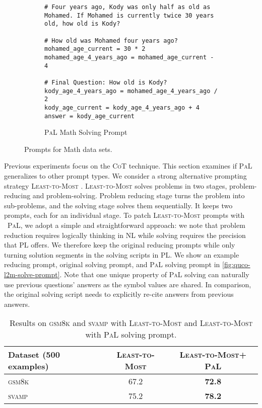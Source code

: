 \documentclass[dvipsnames]{article} \usepackage[accepted]{icml2022}
\newcommand{\ours}{\textsc{PaL}\xspace}
\newcommand{\cotp}{\textsc{CoT}\xspace}
\newcommand{\tomost}{\textsc{Least-to-Most}\xspace}
\newcommand{\gsm}{\textsc{gsm8k}\xspace}
\newcommand{\svamp}{\textsc{svamp}\xspace}
\begin{document}
\begin{figure*}[!ht]
\begin{subfigure}[t]{.95\textwidth}

 \begin{verbatim}
# Four years ago, Kody was only half as old as Mohamed. If Mohamed is currently twice 30 years old, how old is Kody?

# How old was Mohamed four years ago?
mohamed_age_current = 30 * 2
mohamed_age_4_years_ago = mohamed_age_current - 4

# Final Question: How old is Kody?
kody_age_4_years_ago = mohamed_age_4_years_ago / 2
kody_age_current = kody_age_4_years_ago + 4
answer = kody_age_current
\end{verbatim}
\caption{\ours Math Solving Prompt}
\end{subfigure}
\caption{Prompts for Math data sets.}
\label{fig:quco-l2m-solve-prompt}
 \end{figure*}

Previous experiments focus on the \cotp technique. This section examines if \ours generalizes to other prompt types. We consider a strong alternative prompting strategy \tomost 
\cite{zhou2022least}. \tomost solves problems in two stages, problem-reducing and problem-solving. Problem reducing stage turns the problem into sub-problems, and the solving stage solves them sequentially. It keeps two prompts, each for an individual stage. To patch \tomost prompts with \
\ours, we adopt a simple and straightforward approach: we note that problem reduction requires logically thinking in NL while solving requires the precision that PL offers. We therefore keep the original reducing prompts while only turning solution segments in the solving scripts in PL. We show an example reducing prompt, original solving prompt, and \ours solving prompt in \autoref{fig:quco-l2m-solve-prompt}. Note that one unique property of \ours solving can naturally use previous questions' answers as the symbol values are shared. In comparison, the original solving script needs to explicitly re-cite answers from previous answers.

\begin{table}[h!]
\centering
\begin{tabular}{@{}lcc@{}}
\toprule
Dataset (500 examples)                 & \tomost & \tomost + \ours \\ \midrule
\gsm               & 67.2  & \textbf{72.8}                     \\
\svamp                 & 75.2     & \textbf{78.2}                     \\ \bottomrule
\end{tabular}
\caption{Results on \gsm and \svamp with \tomost and \tomost with \ours solving prompt.}
\label{tab:quco-l2m:results}
\end{table}
\end{document}
